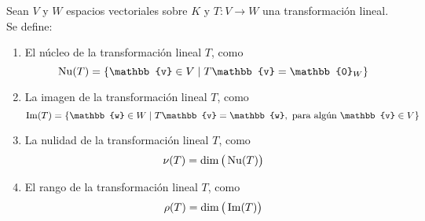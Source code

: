 \begin{definition}
    Sean $V$ y $W$ espacios vectoriales sobre $K$ y $T:V \longrightarrow W$ una transformación lineal. Se define:
    \begin{enumerate}[label=\roman*)]
        \item El núcleo de la transformación lineal $T$, como
        $$\Nuc(T) = \left\{ \mathbb{v} \in V \mid T\mathbb{v} = \mathbb{0}_W \right\}$$
        \item La imagen de la transformación lineal $T$, como
        $$\Ima(T) = \left\{ \mathbb{w} \in W \mid T\mathbb{v} = \mathbb{w}, \text{ para algún } \mathbb{v} \in V \right\}$$
        \item La nulidad de la transformación lineal $T$, como
        $$\nu(T) = \operatorname{dim} \big( \operatorname{Nu}(T) \big)$$
        \item El rango de la transformación lineal $T$, como
        $$\rho(T) = \operatorname{dim} \big( \operatorname{Im}(T) \big)$$
    \end{enumerate}
\end{definition}

\newpage

